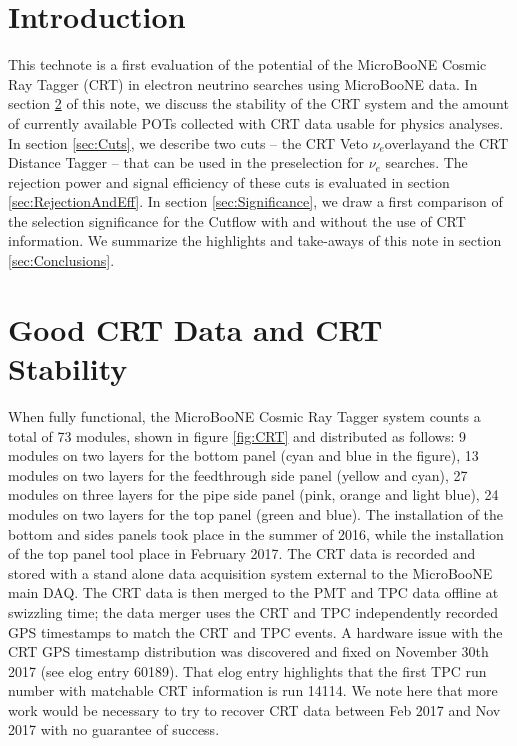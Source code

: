 \section{Introduction}\label{sec:Introduction}
This technote is a first evaluation of the potential of the MicroBooNE Cosmic Ray Tagger (CRT) in electron neutrino searches using MicroBooNE data.  In section \ref{sec:Stability} of this note, we discuss the stability of the CRT system and the amount of  currently available POTs collected with CRT data usable for physics analyses. In section \ref{sec:Cuts}, we describe two cuts -- the CRT Veto $\nu_e$overlayand the CRT Distance Tagger -- that can be used in  the  preselection for $\nu_e$ searches. The rejection power and signal efficiency of these cuts is evaluated in section \ref{sec:RejectionAndEff}. In section \ref{sec:Significance}, we draw a first comparison of the selection significance for the Cutflow with and without the use of CRT information. We summarize the highlights and take-aways of this note in section \ref{sec:Conclusions}. 

\section{Good CRT Data and CRT Stability}\label{sec:Stability}
When fully functional, the MicroBooNE Cosmic Ray Tagger system counts a total of 73 modules, shown in figure \ref{fig:CRT} and distributed as follows: 9 modules on two layers for the bottom panel (cyan and blue in the figure), 13 modules on two layers for the feedthrough side panel (yellow and cyan),  27 modules on three layers for the pipe side panel (pink, orange and light blue),  24 modules on two layers for the top panel (green and blue).  The installation of the bottom and sides panels took place in the summer of 2016, while the installation of the top panel tool place in February 2017. 
The CRT data is recorded and stored with a stand alone data acquisition system external to the MicroBooNE main DAQ. The CRT data is then merged to the PMT and TPC data offline at swizzling time; the data merger uses the CRT and TPC independently recorded GPS timestamps to match the CRT and TPC events. A hardware issue with the CRT GPS timestamp distribution was discovered and fixed on November 30th 2017 (see elog entry 60189). That elog entry highlights that the first TPC run number with matchable CRT information is run 14114.  We note here that more work would be necessary to try to recover CRT data between Feb 2017 and Nov 2017 with no guarantee of success. 


